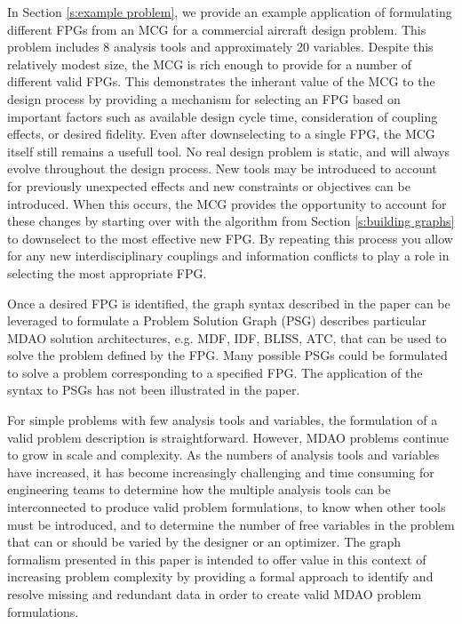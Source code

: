 In Section \ref{s:example problem}, we provide an example application of formulating different FPGs from an MCG 
for a commercial aircraft design problem. This problem includes 8 
analysis tools and approximately 20 variables. Despite this relatively modest size, 
the MCG is rich enough to provide for a number of different valid FPGs. This demonstrates
the inherant value of the MCG to the design process by providing a mechanism for selecting 
an FPG based on important factors such as available design cycle time, consideration of 
coupling effects, or desired fidelity. Even after downselecting to a single FPG, the 
MCG itself still remains a usefull tool. No real design problem is static, and will always
evolve throughout the design process. New tools may be introduced to account for previously 
unexpected effects and new constraints or objectives can be introduced. When this occurs, 
the MCG provides the opportunity to account for these changes by starting over with the 
algorithm from Section \ref{s:building graphs} to downselect to the most effective new FPG. 
By repeating this process you allow for any new interdisciplinary couplings and  
information conflicts to play a role in selecting the most appropriate FPG. 



Once a desired FPG is identified, the graph syntax described in the paper can be leveraged to formulate a Problem Solution Graph (PSG) describes particular MDAO solution architectures, e.g. MDF, IDF, BLISS, ATC, that can be used to solve the problem defined by the FPG.  
Many possible PSGs could be formulated to solve a problem corresponding to a specified FPG.   
The application of the syntax to PSGs has not been illustrated in the paper.

For simple problems with few analysis tools and variables, the formulation of a valid problem description is straightforward.  
However, MDAO problems continue to grow in scale and complexity.  
As the numbers of analysis tools and variables have increased, it has become increasingly challenging and time consuming for engineering teams to determine how the multiple analysis tools can be interconnected to produce valid problem formulations, to know when other tools must be introduced, and to determine the number of free variables in the problem that can or should be varied by the designer or an optimizer.  
The graph formalism presented in this paper is intended to offer value in this context of increasing problem complexity by providing a formal approach to identify and resolve missing and redundant data in order to create valid MDAO problem formulations.  


